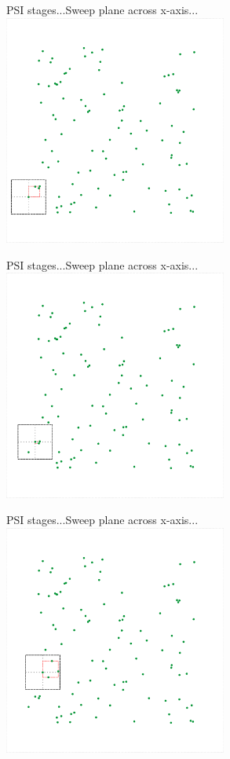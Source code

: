 \documentclass{beamer}
\begin{document}
\begin{frame}{PSI stages...}{Sweep plane across x-axis...}
    \centering
    \includegraphics[width=0.55\textwidth]{figures/psi02}
\end{frame}

\begin{frame}{PSI stages...}{Sweep plane across x-axis...}
    \centering
    \includegraphics[width=0.55\textwidth]{figures/psi03}
\end{frame}

\begin{frame}{PSI stages...}{Sweep plane across x-axis...}
    \centering
    \includegraphics[width=0.55\textwidth]{figures/psi04}
\end{frame}
\end{document}
